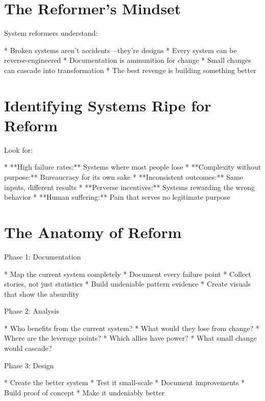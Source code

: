 \documentclass[12pt,oneside]{book}
\begin{document}
\section{The Reformer's Mindset}

System reformers understand:

                    * Broken systems aren't accidents---they're designs
                    * Every system can be reverse-engineered
                    * Documentation is ammunition for change
                    * Small changes can cascade into transformation
                    * The best revenge is building something better

\section{Identifying Systems Ripe for Reform}

Look for:

                    * **High failure rates:** Systems where most people lose
                    * **Complexity without purpose:** Bureaucracy for its own sake
                    * **Inconsistent outcomes:** Same inputs, different results
                    * **Perverse incentives:** Systems rewarding the wrong behavior
                    * **Human suffering:** Pain that serves no legitimate purpose

\section{The Anatomy of Reform}

                Phase 1: Documentation

                    * Map the current system completely
                    * Document every failure point
                    * Collect stories, not just statistics
                    * Build undeniable pattern evidence
                    * Create visuals that show the absurdity

                Phase 2: Analysis

                    * Who benefits from the current system?
                    * What would they lose from change?
                    * Where are the leverage points?
                    * Which allies have power?
                    * What small change would cascade?

                Phase 3: Design

                    * Create the better system
                    * Test it small-scale
                    * Document improvements
                    * Build proof of concept
                    * Make it undeniably better
\end{document}

